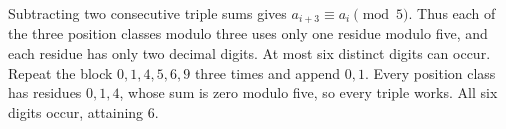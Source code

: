Subtracting two consecutive triple sums gives $a_{i+3}\equiv a_i\pmod5$. Thus each of the three position classes modulo three uses only one residue modulo five, and each residue has only two decimal digits. At most six distinct digits can occur. Repeat the block $0,1,4,5,6,9$ three times and append $0,1$. Every position class has residues $0,1,4$, whose sum is zero modulo five, so every triple works. All six digits occur, attaining $\boxed6$.
